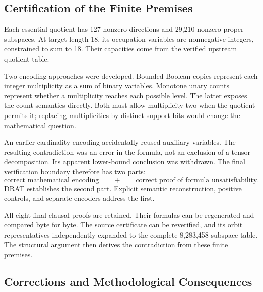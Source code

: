 \subsection{Certification of the Finite Premises}\label{route:certificates}

Each essential quotient has 127 nonzero directions and 29,210
nonzero proper subspaces. At target length 18, its occupation
variables are nonnegative integers, constrained to sum to 18.
Their capacities come from the verified upstream quotient table.

Two encoding approaches were developed. Bounded Boolean copies
represent each integer multiplicity as a sum of binary variables.
Monotone unary counts represent whether a multiplicity reaches
each possible level. The latter exposes the count semantics
directly. Both must allow multiplicity two when the quotient
permits it; replacing multiplicities by distinct-support bits
would change the mathematical question.

An earlier cardinality encoding accidentally reused auxiliary
variables. The resulting contradiction was an error in the
formula, not an exclusion of a tensor decomposition. Its apparent
lower-bound conclusion was withdrawn. The final verification
boundary therefore has two parts:
\[
 \text{correct mathematical encoding}
 \qquad+\qquad
 \text{correct proof of formula unsatisfiability}.
\]
DRAT establishes the second part. Explicit semantic reconstruction,
positive controls, and separate encoders address the first.

All eight final clausal proofs are retained. Their formulas can
be regenerated and compared byte for byte. The source certificate
can be reverified, and its orbit representatives independently
expanded to the complete 8,283,458-subspace table. The structural
argument then derives the contradiction from these finite premises.

\subsection{Corrections and Methodological Consequences}\label{route:corrections}

